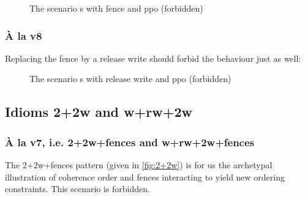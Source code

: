 \documentclass[a4paper]{article}
\begin{document}
\begin{figure}[!h]
\begin{center}
\end{center}
\vspace*{-8mm}
\caption{The scenario \textsf{s} with fence and ppo (forbidden)\label{fig:s}}
\vspace*{-6mm}
\end{figure}


\subsubsection{\`A la v8}

Replacing the fence by a release write should forbid the behaviour just as
well:

\begin{figure}[!h]
\begin{center}
\end{center}
\vspace*{-8mm}
\caption{The scenario \textsf{s} with release write and ppo (forbidden)\label{fig:s-rel}}
\end{figure}

\clearpage

\subsection{Idioms \textsf{2+2w} and \textsf{w+rw+2w}}

\subsubsection{\`A la v7, i.e. \textsf{2+2w+fences} and \textsf{w+rw+2w+fences}}

The \textsf{2+2w+fences} pattern (given in \myfig\ref{fig:2+2w}) is for us
the archetypal illustration of coherence order and fences interacting to yield
new ordering constraints. This scenario is forbidden.
\end{document}
